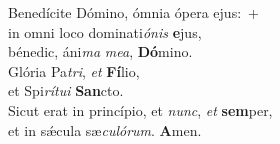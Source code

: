 \evenverse Benedícite Dómino, ómnia ópera ejus:~+\\
\evenverse  in omni loco dominati\textit{ó}\textit{nis} \textbf{e}jus,~\*\\
\evenverse bénedic, áni\textit{ma} \textit{me}\textit{a}, \textbf{Dó}mino.\\
\oddverse Glória Pa\textit{tri}, \textit{et} \textbf{Fí}lio,~\*\\
\oddverse et Spi\textit{rí}\textit{tu}\textit{i} \textbf{San}cto.\\
\evenverse Sicut erat in princípio, et \textit{nunc}, \textit{et} \textbf{sem}per,~\*\\
\evenverse et in sǽcula sæ\textit{cu}\textit{ló}\textit{rum}. \textbf{A}men.\\
